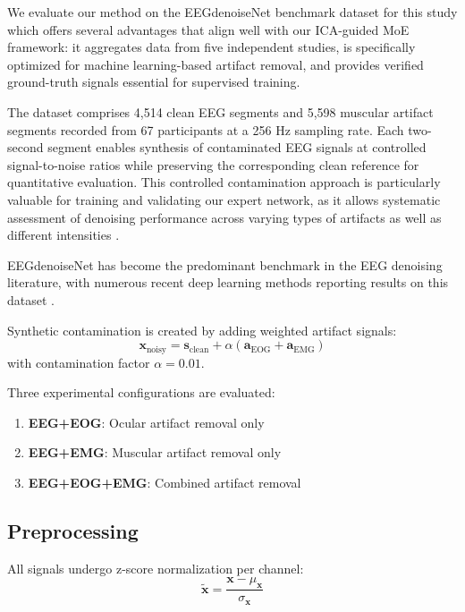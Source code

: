 \documentclass{article}
\begin{document}
We evaluate our method on the EEGdenoiseNet benchmark dataset \cite{eegdenoisenet2021} for this study which offers several advantages that align well with our ICA-guided MoE framework: it aggregates data from five independent studies, is specifically optimized for machine learning-based artifact removal, and provides verified ground-truth signals essential for supervised training.

The dataset comprises 4,514 clean EEG segments and 5,598 muscular artifact segments recorded from 67 participants at a 256 Hz sampling rate. Each two-second segment enables synthesis of contaminated EEG signals at controlled signal-to-noise ratios while preserving the corresponding clean reference for quantitative evaluation. This controlled contamination approach is particularly valuable for training and validating our expert network, as it allows systematic assessment of denoising performance across varying types of artifacts as well as different intensities \cite{choi2025moeemg}.

EEGdenoiseNet \cite{eegdenoisenet2021} has become the predominant benchmark in the EEG denoising literature, with numerous recent deep learning methods reporting results on this dataset \cite{choi2025moeemg}. 

Synthetic contamination is created by adding weighted artifact signals:
\begin{equation}
\mathbf{x}_{\text{noisy}} = \mathbf{s}_{\text{clean}} + \alpha (\mathbf{a}_{\text{EOG}} + \mathbf{a}_{\text{EMG}})
\end{equation}
with contamination factor $\alpha = 0.01$.

Three experimental configurations are evaluated:
\begin{enumerate}
\item \textbf{EEG+EOG}: Ocular artifact removal only
\item \textbf{EEG+EMG}: Muscular artifact removal only
\item \textbf{EEG+EOG+EMG}: Combined artifact removal
\end{enumerate}

\subsection{Preprocessing}

All signals undergo z-score normalization per channel:
\begin{equation}
\tilde{\mathbf{x}} = \frac{\mathbf{x} - \mu_{\mathbf{x}}}{\sigma_{\mathbf{x}}}
\end{equation}
\end{document}
